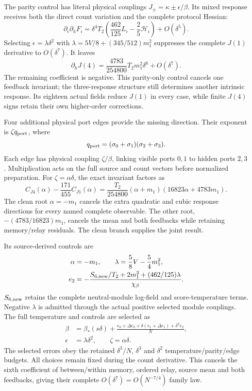 The parity control has literal physical couplings $J_\pm=\kappa\pm\epsilon/\beta$. Its mixed response receives both the direct count variation and the complete protocol Hessian:
\begin{equation}
 \partial_\epsilon\partial_hF_i
 =\delta^4T_2\left(\frac{462}{125}L_i-\frac25\mathcal H_i\right)
 +O(\delta^5).
\end{equation}
Selecting $\epsilon=\lambda\delta^2$ with
$\lambda=5V/8+(345/512)m_1^2$ suppresses the complete $J(1)$ derivative to $O(\delta^7)$. It leaves
\begin{equation}
 \partial_hJ(4)=
 \frac{4783}{254800}T_2m_1^2\delta^6+O(\delta^7).
\end{equation}
The remaining coefficient is negative. This parity-only control cancels one feedback invariant; the three-response structure still determines another intrinsic response. Its eighteen actual fields reduce $J(1)$ in every case, while finite $J(4)$ signs retain their own higher-order corrections.

Four additional physical port edges provide the missing direction. Their exponent is $\zeta q_{\rm port}$, where
\begin{equation}
 q_{\rm port}=(\sigma_0+\sigma_1)(\sigma_2+\sigma_3).
\end{equation}
Each edge has physical coupling $\zeta/\beta$, linking visible ports $0,1$ to hidden ports $2,3$. Multiplication acts on the full source and count vectors before normalized preparation. For $\zeta=\alpha\delta$, the exact invariant factors as
\begin{equation}
 C_{J4}(\alpha)-\frac{171}{455}C_{J1}(\alpha)
 =\frac{T_2}{254800}(\alpha+m_1)(16823\alpha+4783m_1).
\end{equation}
The clean root $\alpha=-m_1$ cancels the extra quadratic and cubic response directions for every named complete observable. The other root, $-(4783/16823)m_1$, cancels the mean and both feedbacks while retaining memory/relay residuals. The clean branch supplies the joint result.

Its source-derived controls are
\begin{align}
 \alpha&=-m_1,\qquad \lambda=\frac58V-\frac54m_1^2,\\
 e_2&=-\frac{S_{6,\rm new}/T_2+2m_1^2+(462/125)\lambda}{\chi_\beta}.
\end{align}
$S_{6,\rm new}$ retains the complete neutral-module log-field and score-temperature terms. Negative $\lambda$ is admitted through the actual positive selected module couplings. The full temperature and controls are selected as
\begin{align}
 \beta&=\beta_*(s\delta)+
 \frac{e_0+\Delta e_0+\delta(e_1+\Delta e_1)+\delta^2e_2}{N},\\
 \epsilon&=\lambda\delta^2,\qquad \zeta=\alpha\delta.
\end{align}
The selected errors obey the retained $\delta^3/N$, $\delta^3$ and $\delta^2$ temperature/parity/edge budgets. All choices remain fixed during the count derivative. This cancels the sixth coefficient of between/within memory, ordered relay, source mean and both feedbacks, giving their complete $O(\delta^7)=O(N^{-7/4})$ family law.


